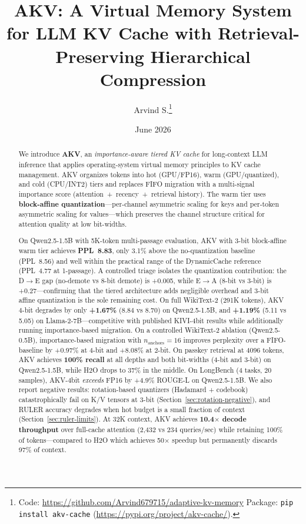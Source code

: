 \documentclass[11pt,a4paper]{article}
\title{\textbf{AKV: A Virtual Memory System for LLM KV Cache with Retrieval-Preserving Hierarchical Compression}}
\author{Arvind S.\thanks{Code: \url{https://github.com/Arvind679715/adaptive-kv-memory} \quad Package: \texttt{pip install akv-cache} (\url{https://pypi.org/project/akv-cache/}).}}
\affil{Independent Research \\ \texttt{arvind679715@gmail.com}}
\date{June 2026}
\begin{document}
\maketitle

\begin{abstract}
We introduce \textbf{AKV}, an \emph{importance-aware tiered KV cache} for long-context LLM inference that applies operating-system virtual memory principles to KV cache management. AKV organizes tokens into hot (GPU/FP16), warm (GPU/quantized), and cold (CPU/INT2) tiers and replaces FIFO migration with a multi-signal importance score (attention~+~recency~+~retrieval history). The warm tier uses \textbf{block-affine quantization}---per-channel asymmetric scaling for keys and per-token asymmetric scaling for values---which preserves the channel structure critical for attention quality at low bit-widths.

On Qwen2.5-1.5B with 5K-token multi-passage evaluation, AKV with 3-bit block-affine warm tier achieves \textbf{PPL~8.83}, only 3.1\% above the no-quantization baseline (PPL~8.56) and well within the practical range of the DynamicCache reference (PPL~4.77 at 1-passage). A controlled triage isolates the quantization contribution: the D$\to$E gap (no-demote vs 8-bit demote) is +0.005, while E$\to$A (8-bit vs 3-bit) is +0.27---confirming that the tiered architecture adds negligible overhead and 3-bit affine quantization is the sole remaining cost. On full WikiText-2 (291K tokens), AKV 4-bit degrades by only \textbf{+1.67\%} (8.84 vs 8.70) on Qwen2.5-1.5B, and \textbf{+1.19\%} (5.11 vs 5.05) on Llama-2-7B---competitive with published KIVI-4bit results while additionally running importance-based migration. On a controlled WikiText-2 ablation (Qwen2.5-0.5B), importance-based migration with $n_\text{anchors}{=}16$ improves perplexity over a FIFO-baseline by +0.97\% at 4-bit and +8.08\% at 2-bit. On passkey retrieval at 4096 tokens, AKV achieves \textbf{100\% recall} at all depths and both bit-widths (4-bit and 3-bit) on Qwen2.5-1.5B, while H2O drops to 37\% in the middle. On LongBench (4 tasks, 20 samples), AKV-4bit \textit{exceeds} FP16 by +4.9\% ROUGE-L on Qwen2.5-1.5B. We also report negative results: rotation-based quantizers (Hadamard + codebook) catastrophically fail on K/V tensors at 3-bit (Section~\ref{sec:rotation-negative}), and RULER accuracy degrades when hot budget is a small fraction of context (Section~\ref{sec:ruler-limits}). At 32K context, AKV achieves \textbf{10.4$\times$ decode throughput} over full-cache attention (2,432 vs 234 queries/sec) while retaining 100\% of tokens---compared to H2O which achieves 50$\times$ speedup but permanently discards 97\% of context.
\end{abstract}
\end{document}
